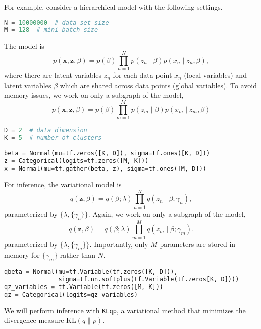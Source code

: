 For example, consider a hierarchical model with the following settings.
\begin{lstlisting}[language=Python]
N = 10000000  # data set size
M = 128  # mini-batch size
\end{lstlisting}
The model is
\begin{equation*}
p(\mathbf{x}, \mathbf{z}, \beta)
= p(\beta) \prod_{n=1}^N p(z_n \mid \beta) p(x_n \mid z_n, \beta),
\end{equation*}
where there are latent variables $z_n$ for
each data point $x_n$ (local variables) and latent variables $\beta$
which are shared across data points (global variables).
To avoid memory issues, we work on only a subgraph of the model,
\begin{equation*}
p(\mathbf{x}, \mathbf{z}, \beta)
= p(\beta) \prod_{m=1}^M p(z_m \mid \beta) p(x_m \mid z_m, \beta)
\end{equation*}
\begin{lstlisting}[language=Python]
D = 2  # data dimension
K = 5  # number of clusters

beta = Normal(mu=tf.zeros([K, D]), sigma=tf.ones([K, D]))
z = Categorical(logits=tf.zeros([M, K]))
x = Normal(mu=tf.gather(beta, z), sigma=tf.ones([M, D]))
\end{lstlisting}
For inference, the variational model is
\begin{equation*}
q(\mathbf{z}, \beta) =
q(\beta; \lambda) \prod_{n=1}^N q(z_n \mid \beta; \gamma_n),
\end{equation*}
parameterized by $\{\lambda, \{\gamma_n\}\}$.
Again, we work on only a subgraph of the model,
\begin{equation*}
q(\mathbf{z}, \beta) =
q(\beta; \lambda) \prod_{m=1}^M q(z_m \mid \beta; \gamma_m).
\end{equation*}
parameterized by $\{\lambda, \{\gamma_m\}\}$. Importantly, only $M$
parameters are stored in memory for $\{\gamma_m\}$ rather than $N$.
\begin{lstlisting}[language=Python]
qbeta = Normal(mu=tf.Variable(tf.zeros([K, D])),
               sigma=tf.nn.softplus(tf.Variable(tf.zeros[K, D])))
qz_variables = tf.Variable(tf.zeros([M, K]))
qz = Categorical(logits=qz_variables)
\end{lstlisting}
We will perform inference with \texttt{KLqp}, a variational method
that minimizes the divergence measure $\text{KL}(q\| p)$.

